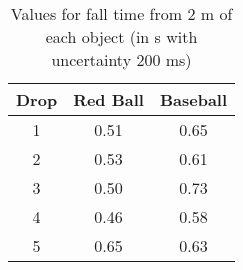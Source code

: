 \documentclass[12pt,a4paper]{article}
\begin{document}
\begin{table}
   \begin{minipage}[c]{0.65\textwidth}
   \centering
   \begin{tabular}{c||c|c}
       Drop & Red Ball & Baseball \\
       \hline
       1 & 0.51 & 0.65 \\
       2 & 0.53 & 0.61 \\
       3 & 0.50 & 0.73 \\
       4 & 0.46 & 0.58 \\
       5 & 0.65 & 0.63 
   \end{tabular}
   \caption{Values for fall time from 2 \si{\m} of each object (in \si{\s} with uncertainty 200 \si{\ms})}
\end{minipage}
\end{table}
\end{document}
